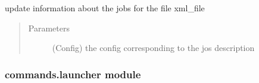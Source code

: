 \documentclass[a4paper,10pt,english]{sphinxmanual}
\begin{document}
\begin{fulllineitems}
\label{\detokenize{apidoc_commands/commands:commands.jobs.develop_factorized_jobs}}
update information about the jobs for the file xml\_file
\begin{quote}\begin{description}
\item[{Parameters}] \leavevmode
{} \textendash{} (Config) 
the config corresponding to the jos description

\end{description}\end{quote}

\end{fulllineitems}


\begin{fulllineitems}
\label{\detokenize{apidoc_commands/commands:commands.jobs.getParamiko}}
\end{fulllineitems}


\begin{fulllineitems}
\label{\detokenize{apidoc_commands/commands:commands.jobs.get_config_file_path}}
\end{fulllineitems}



\subsubsection{commands.launcher module}
\label{\detokenize{apidoc_commands/commands:commands-launcher-module}}\label{\detokenize{apidoc_commands/commands:module-commands.launcher}}
\end{document}
